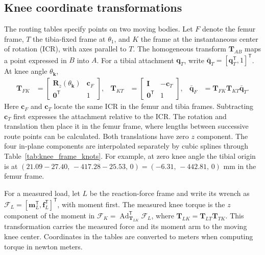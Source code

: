 \documentclass[utf8]{frontiers_suppmat} %
\begin{document}
\clearpage
\subsection{Knee coordinate transformations}\label{sec:knee_frames}
The routing tables specify points on two moving bodies. Let $F$ denote the femur frame, $T$ the tibia-fixed frame at $\theta_1$, and $K$ the frame at the instantaneous center of rotation (ICR), with axes parallel to $T$. The homogeneous transform $\mathbf T_{AB}$ maps a point expressed in $B$ into $A$. For a tibial attachment $\mathbf q_T$, write $\bar{\mathbf q}_T=[\mathbf q_T^{\mathsf T},1]^{\mathsf T}$. At knee angle $\theta_{\mathbf k}$,
\begin{equation*}
\begin{aligned}
\mathbf T_{FK}&=\begin{bmatrix}\mathbf R_z(\theta_{\mathbf k}) & \mathbf c_F\\\mathbf 0^{\mathsf T}&1\end{bmatrix},&
\mathbf T_{KT}&=\begin{bmatrix}\mathbf I & -\mathbf c_T\\\mathbf 0^{\mathsf T}&1\end{bmatrix},&
\bar{\mathbf q}_F&=\mathbf T_{FK}\mathbf T_{KT}\bar{\mathbf q}_T .
\end{aligned}
\end{equation*}
Here $\mathbf c_F$ and $\mathbf c_T$ locate the same ICR in the femur and tibia frames. Subtracting $\mathbf c_T$ first expresses the attachment relative to the ICR. The rotation and translation then place it in the femur frame, where lengths between successive route points can be calculated. Both translations have zero $z$ component. The four in-plane components are interpolated separately by cubic splines through Table~\ref{tab:knee_frame_knots}. For example, at zero knee angle the tibial origin is at $(21.09-27.40,\,-417.28-25.53,\,0)=(-6.31,\,-442.81,\,0)$ mm in the femur frame.

For a measured load, let $L$ be the reaction-force frame and write its wrench as $\mathcal F_L=[\mathbf m_L^{\mathsf T},\mathbf f_L^{\mathsf T}]^{\mathsf T}$, with moment first. The measured knee torque is the $z$ component of the moment in $\mathcal F_K=\operatorname{Ad}_{\mathbf T_{LK}}^{\mathsf T}\mathcal F_L$, where $\mathbf T_{LK}=\mathbf T_{LT}\mathbf T_{TK}$. This transformation carries the measured force and its moment arm to the moving knee center. Coordinates in the tables are converted to meters when computing torque in newton meters.
\end{document}
